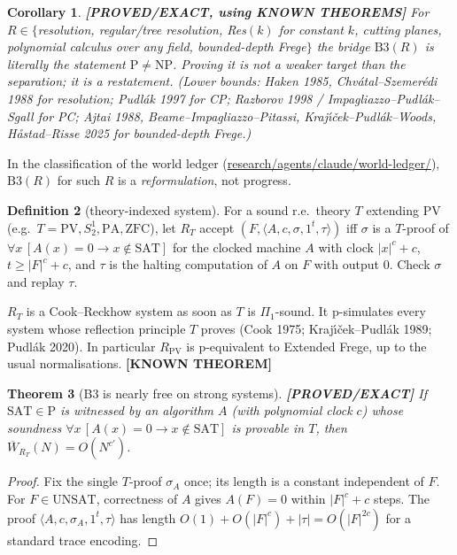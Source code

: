 \documentclass[11pt]{article}
\newtheorem{theorem}{Theorem}
\newtheorem{corollary}[theorem]{Corollary}
\theoremstyle{definition}
\newtheorem{definition}[theorem]{Definition}
\theoremstyle{remark}
\newcommand{\SAT}{\mathrm{SAT}}
\newcommand{\UNSAT}{\mathrm{UNSAT}}
\newcommand{\Wb}{\overline W}
\newcommand{\status}[1]{\textbf{[#1]}}
\begin{document}
\begin{corollary}\label{cor:weak}
\status{PROVED/EXACT, using KNOWN THEOREMS} For $R\in\{$resolution, regular/tree resolution, Res$(k)$ for
constant $k$, cutting planes, polynomial calculus over any field, bounded-depth Frege$\}$ the bridge
$\mathrm{B3}(R)$ is \emph{literally} the statement $\mathrm P\ne\mathrm{NP}$. Proving it is not a weaker
target than the separation; it is a restatement. (Lower bounds: Haken 1985, Chv\'atal--Szemer\'edi 1988 for
resolution; Pudl\'ak 1997 for CP; Razborov 1998 / Impagliazzo--Pudl\'ak--Sgall for PC; Ajtai 1988,
Beame--Impagliazzo--Pitassi, Kraj\'{\i}\v{c}ek--Pudl\'ak--Woods, H{\aa}stad--Risse 2025 for bounded-depth Frege.)
\end{corollary}

In the classification of the world ledger (\url{research/agents/claude/world-ledger/}), $\mathrm{B3}(R)$ for
such $R$ is a \emph{reformulation}, not progress.

\begin{definition}[theory-indexed system]
For a sound r.e.\ theory $T$ extending $\mathrm{PV}$ (e.g.\ $T=\mathrm{PV}, S^1_2, \mathrm{PA}, \mathrm{ZFC}$),
let $R_T$ accept $(F,\langle A,c,\sigma,1^t,\tau\rangle)$ iff $\sigma$ is a $T$-proof of
$\forall x\,[A(x)=0\to x\notin\SAT]$ for the clocked machine $A$ with clock $|x|^c+c$, $t\ge|F|^c+c$, and
$\tau$ is the halting computation of $A$ on $F$ with output $0$. Check $\sigma$ and replay $\tau$.
\end{definition}

$R_T$ is a Cook--Reckhow system as soon as $T$ is $\Pi_1$-sound. It p-simulates every system whose reflection
principle $T$ proves (Cook 1975; Kraj\'{\i}\v{c}ek--Pudl\'ak 1989; Pudl\'ak 2020). In particular
$R_{\mathrm{PV}}$ is p-equivalent to Extended Frege, up to the usual normalisations. \status{KNOWN THEOREM}

\begin{theorem}[B3 is nearly free on strong systems]\label{thm:strong}
\status{PROVED/EXACT} If $\SAT\in\mathrm P$ is witnessed by an algorithm $A$ (with polynomial clock $c$)
whose soundness $\forall x\,[A(x)=0\to x\notin\SAT]$ is provable in $T$, then $\Wb_{R_T}(N)=O(N^{c'})$.
\end{theorem}
\begin{proof}
Fix the single $T$-proof $\sigma_A$ once; its length is a constant independent of $F$. For $F\in\UNSAT$,
correctness of $A$ gives $A(F)=0$ within $|F|^c+c$ steps. The proof $\langle A,c,\sigma_A,1^t,\tau\rangle$
has length $O(1)+O(|F|^{c})+|\tau|=O(|F|^{2c})$ for a standard trace encoding.
\end{proof}
\end{document}

